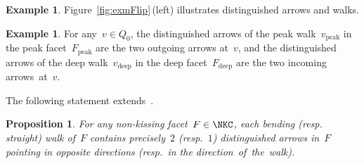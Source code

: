 \documentclass{memo-l}
\newtheorem{proposition}[theorem]{Proposition}
\theoremstyle{definition}
\newtheorem{example}[theorem]{Example}
\newcommand{\fref}[1]{Figure~\ref{#1}} %
\newcommand{\peak}{\mathrm{peak}} %
\newcommand{\deep}{\mathrm{deep}} %
\begin{document}
\begin{example}
\fref{fig:exmFlip}\,(left) illustrates distinguished arrows and walks.
\end{example}

\begin{example}
For any~$v \in Q_0$, the distinguished arrows of the peak walk~$v_\peak$ in the peak facet~$F_\peak$ are the two outgoing arrows at~$v$, and the distinguished arrows of the deep walk~$v_\deep$ in the deep facet~$F_\deep$ are the two incoming arrows~at~$v$.
\end{example}

The following statement extends~\cite[Thm.~3.2]{McConville}.

\begin{proposition}
\label{prop:distinguishedArrows}
For any non-kissing facet~$F \in \NKC$, each bending (resp. straight) walk of~$F$ contains precisely~$2$ (resp.~$1$) distinguished arrows in~$F$ pointing in opposite directions (resp.~in the direction~of~the~walk).
\end{proposition}
\end{document}
